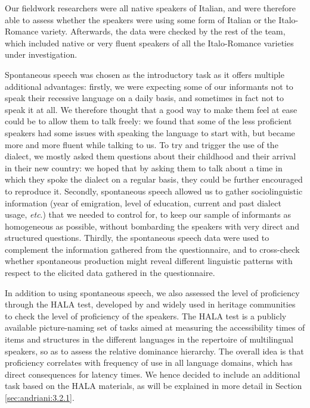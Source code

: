 \documentclass[output=paper,hidelinks]{langscibook}
\begin{document}
Our fieldwork researchers were all native speakers of Italian, and were therefore able to assess whether the speakers were using some form of Italian or the Italo-Romance variety. Afterwards, the data were checked by the rest of the team, which included native or very fluent speakers of all the Italo-Romance varieties under investigation.

Spontaneous speech was chosen as the introductory task as it offers multiple additional advantages: firstly, we were expecting some of our informants not to speak their recessive language on a daily basis, and sometimes in fact not to speak it at all. We therefore thought that a good way to make them feel at ease could be to allow them to talk freely: we found that some of the less proficient speakers had some issues with speaking the language to start with, but became more and more fluent while talking to us. To try and trigger the use of the dialect, we mostly asked them questions about their childhood and their arrival in their new country: we hoped that by asking them to talk about a time in which they spoke the dialect on a regular basis, they could be further encouraged to reproduce it. Secondly, spontaneous speech allowed us to gather sociolinguistic information (year of emigration, level of education, current and past dialect usage, \textit{etc}.) that we needed to control for, to keep our sample of informants as homogeneous as possible, without bombarding the speakers with very direct and structured questions. Thirdly, the spontaneous speech data were used to complement the information gathered from the questionnaire, and to cross-check whether spontaneous production might reveal different linguistic patterns with respect to the elicited data gathered in the questionnaire.

In addition to using spontaneous speech, we also assessed the level of proficiency through the HALA test, developed by \citet{OGradyEtAl2009} and widely used in heritage communities to check the level of proficiency of the speakers. The HALA test is a publicly available picture-naming set of tasks aimed at measuring the accessibility times of items and structures in the different languages in the repertoire of multilingual speakers, so as to assess the relative dominance hierarchy. The overall idea is that proficiency correlates with frequency of use in all language domains, which has direct consequences for latency times. We hence decided to include an additional task based on the HALA materials, as will be explained in more detail in Section \ref{sec:andriani:3.2.1}.
\end{document}
